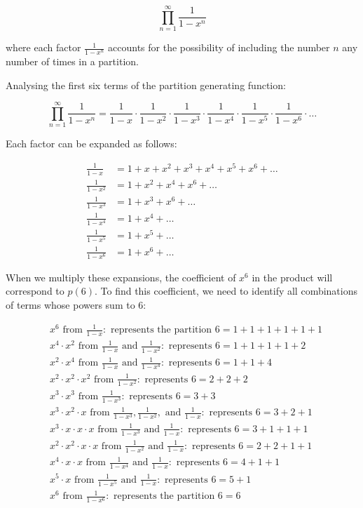 \documentclass{article}
\theoremstyle{definition}
\begin{document}
\[
\prod_{n=1}^{\infty} \frac{1}{1 - x^n}
\]

\noindent
where each factor \( \frac{1}{1 - x^n} \) accounts for the possibility of including the number \( n \) any
number of times in a partition.

\newpage

\noindent
Analysing the first six terms of the partition generating function:

\[
\prod_{n=1}^{\infty} \frac{1}{1 - x^n} = \frac{1}{1-x} \cdot \frac{1}{1-x^2} \cdot \frac{1}{1-x^3} \cdot \frac{1}{1-x^4} \cdot \frac{1}{1-x^5} \cdot \frac{1}{1-x^6} \cdot \dots
\]

\noindent
Each factor can be expanded as follows:

\[
\begin{aligned}
\frac{1}{1-x} &= 1 + x + x^2 + x^3 + x^4 + x^5 + x^6 + \dots \\
\frac{1}{1-x^2} &= 1 + x^2 + x^4 + x^6 + \dots \\
\frac{1}{1-x^3} &= 1 + x^3 + x^6 + \dots \\
\frac{1}{1-x^4} &= 1 + x^4 + \dots \\
\frac{1}{1-x^5} &= 1 + x^5 + \dots \\
\frac{1}{1-x^6} &= 1 + x^6 + \dots
\end{aligned}
\]

\noindent
When we multiply these expansions, the coefficient of $x^6$ in the product will correspond to $p(6)$. To find this coefficient, we need to identify all combinations of terms whose powers sum to 6:

\[
\begin{aligned}
&x^6 \text{ from } \frac{1}{1-x}: \text{ represents the partition } 6 = 1+1+1+1+1+1 \\
&x^4 \cdot x^2 \text{ from } \frac{1}{1-x} \text{ and } \frac{1}{1-x^2}: \text{ represents } 6 = 1+1+1+1+2 \\
&x^2 \cdot x^4 \text{ from } \frac{1}{1-x} \text{ and } \frac{1}{1-x^4}: \text{ represents } 6 = 1+1+4 \\
&x^2 \cdot x^2 \cdot x^2 \text{ from } \frac{1}{1-x^2}: \text{ represents } 6 = 2+2+2 \\
&x^3 \cdot x^3 \text{ from } \frac{1}{1-x^3}: \text{ represents } 6 = 3+3 \\
&x^3 \cdot x^2 \cdot x \text{ from } \frac{1}{1-x^3}, \frac{1}{1-x^2}, \text{ and } \frac{1}{1-x}: \text{ represents } 6 = 3+2+1 \\
&x^3 \cdot x \cdot x \cdot x \text{ from } \frac{1}{1-x^3} \text{ and } \frac{1}{1-x}: \text{ represents } 6 = 3+1+1+1 \\
&x^2 \cdot x^2 \cdot x \cdot x \text{ from } \frac{1}{1-x^2} \text{ and } \frac{1}{1-x}: \text{ represents } 6 = 2+2+1+1 \\
&x^4 \cdot x \cdot x \text{ from } \frac{1}{1-x^4} \text{ and } \frac{1}{1-x}: \text{ represents } 6 = 4+1+1 \\
&x^5 \cdot x \text{ from } \frac{1}{1-x^5} \text{ and } \frac{1}{1-x}: \text{ represents } 6 = 5+1 \\
&x^6 \text{ from } \frac{1}{1-x^6}: \text{ represents the partition } 6 = 6
\end{aligned}
\]
\end{document}
